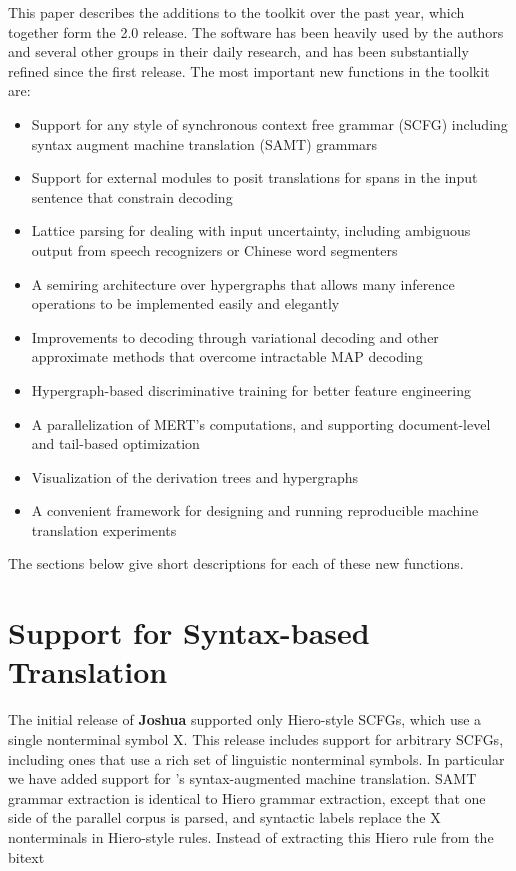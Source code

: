 \documentclass[11pt]{article}
\newcommand{\joshua}{\textbf{Joshua}\xspace}
\begin{document}
This paper describes the additions to the toolkit over the past year, which
together form the 2.0 release. The software has been heavily used by the
authors and several other groups in their daily research, and has been
substantially refined since the first release.  The most important new
functions in the toolkit are:
\begin{itemize}
\item
Support for any style of synchronous context free grammar (SCFG)
including syntax augment machine translation (SAMT) grammars \cite{samt2006}
\item
Support for external modules to posit translations for spans in the input sentence that constrain decoding   \cite{PBML-2010-Joshua-modules}
\item
Lattice parsing for dealing with input uncertainty, including ambiguous output from speech recognizers or Chinese word segmenters  \cite{dyer-muresan-resnik:2008:ACLMain}
\item
A semiring architecture over hypergraphs that allows many inference operations to be implemented easily and elegantly \cite{li-eisner:2009:EMNLP}
\item
Improvements to decoding through variational decoding and other approximate methods that overcome intractable MAP decoding \cite{variational-decoding-acl09}
\item
Hypergraph-based discriminative training for better feature engineering \cite{zhifei-forest-reranking-galebook}
\item
A parallelization of MERT's computations, and supporting document-level and tail-based optimization \cite{atypical-mert}
\item
Visualization of the derivation trees and hypergraphs \cite{PBML-2010-Joshua-visualization}
\item
A convenient framework for designing and running reproducible machine translation experiments \cite{Schwartz-wmt10-pipline}
\end{itemize}
The sections below give short descriptions for each of these new functions.


\section{Support for Syntax-based Translation}

The initial release of \joshua supported only Hiero-style SCFGs, which
use a single nonterminal symbol X.  This release includes support for
arbitrary SCFGs, including ones that use a rich set of linguistic
nonterminal symbols.  In particular we have added support for
's syntax-augmented machine translation. SAMT
grammar extraction is identical to Hiero grammar extraction, except
that one side of the parallel corpus is parsed, and syntactic labels
replace the X nonterminals in Hiero-style rules.  Instead of
extracting this Hiero rule from the bitext
\end{document}
